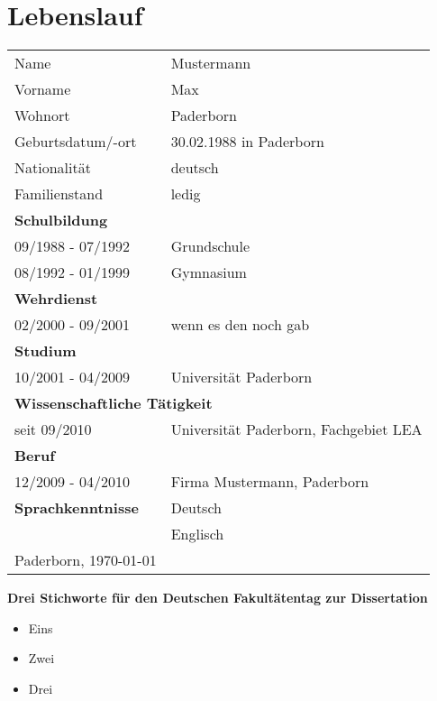 \pagestyle{empty}
\chapter{Lebenslauf}
\label{sec:Lebenslauf}
\begin{tabular}{ll}
  Name 				& Mustermann \\
  Vorname 		& Max \\
  Wohnort			& Paderborn \\
  Geburtsdatum/-ort	& 30.02.1988 in Paderborn \\
  Nationalität & deutsch  \\
  Familienstand & ledig \\[2ex]
  \textbf{Schulbildung} 	&  \\
  09/1988 - 07/1992	& Grundschule \\
  08/1992 - 01/1999 & Gymnasium \\[2ex]
  \textbf{Wehrdienst} 		&  \\
  02/2000 - 09/2001 & wenn es den noch gab \\[2ex]
  \textbf{Studium} 	&  \\
  10/2001 - 04/2009 & Universität Paderborn\\[2ex]
  \multicolumn{2}{l}{\textbf{Wissenschaftliche Tätigkeit} }	 \\
  seit 09/2010			& Universität Paderborn, Fachgebiet LEA \\[2ex]
  \textbf{Beruf} 		&  \\
  12/2009 - 04/2010 & Firma Mustermann, Paderborn \\[2ex]
  \textbf{Sprachkenntnisse} 		&  Deutsch \\
 					&  Englisch \\[2ex]

 Paderborn, \today &\\[10ex]
\end{tabular}

\textbf{Drei Stichworte für den Deutschen Fakultätentag zur Dissertation}
  \begin{itemize}
   \item Eins
   \item Zwei
   \item Drei
  \end{itemize}

